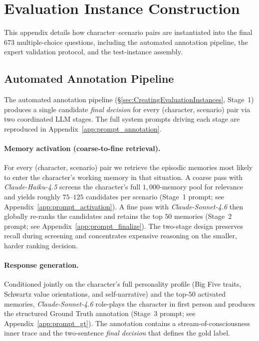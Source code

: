 \section{Evaluation Instance Construction}
\label{app:eval_instance}

This appendix details how character--scenario pairs are instantiated into the final 673 multiple-choice questions, including the automated annotation pipeline, the expert validation protocol, and the test-instance assembly.

\subsection{Automated Annotation Pipeline}
\label{app:annotation}

The automated annotation pipeline (\S\ref{sec:CreatingEvaluationInstances}, Stage~1) produces a single candidate \textit{final decision} for every (character, scenario) pair via two coordinated LLM stages. The full system prompts driving each stage are reproduced in Appendix~\ref{app:prompt_annotation}.

\paragraph{Memory activation (coarse-to-fine retrieval).} For every (character, scenario) pair we retrieve the episodic memories most likely to enter the character's working memory in that situation. A coarse pass with \textit{Claude-Haiku-4.5} screens the character's full $1{,}000$-memory pool for relevance and yields roughly $75$--$125$ candidates per scenario (Stage~1 prompt; see Appendix~\ref{app:prompt_activation}). A fine pass with \textit{Claude-Sonnet-4.6} then globally re-ranks the candidates and retains the top $50$ memories (Stage~2 prompt; see Appendix~\ref{app:prompt_finalize}). The two-stage design preserves recall during screening and concentrates expensive reasoning on the smaller, harder ranking decision.

\paragraph{Response generation.} Conditioned jointly on the character's full personality profile (Big Five traits, Schwartz value orientations, and self-narrative) and the top-$50$ activated memories, \textit{Claude-Sonnet-4.6} role-plays the character in first person and produces the structured Ground Truth annotation (Stage~3 prompt; see Appendix~\ref{app:prompt_gt}). The annotation contains a stream-of-consciousness inner trace and the two-sentence \textit{final decision} that defines the gold label.

